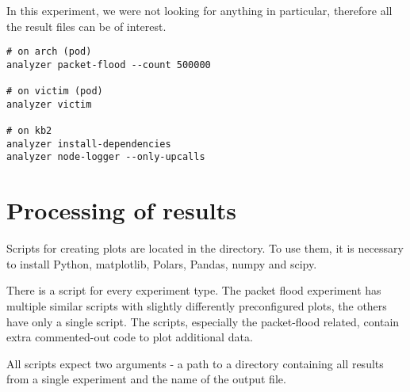 In this experiment, we were not looking for anything in particular, therefore all the result files can be of interest.

\begin{verbatim}
# on arch (pod)
analyzer packet-flood --count 500000

# on victim (pod)
analyzer victim

# on kb2
analyzer install-dependencies
analyzer node-logger --only-upcalls
\end{verbatim}

\section{Processing of results}

Scripts for creating plots are located in the  directory. To use them, it is necessary to install Python, matplotlib, Polars, Pandas, numpy and scipy.

There is a script for every experiment type. The packet flood experiment has multiple similar scripts with slightly differently preconfigured plots, the others have only a single script. The scripts, especially the packet-flood related, contain extra commented-out code to plot additional data.

All scripts expect two arguments - a path to a directory containing all results from a single experiment and the name of the output file.
